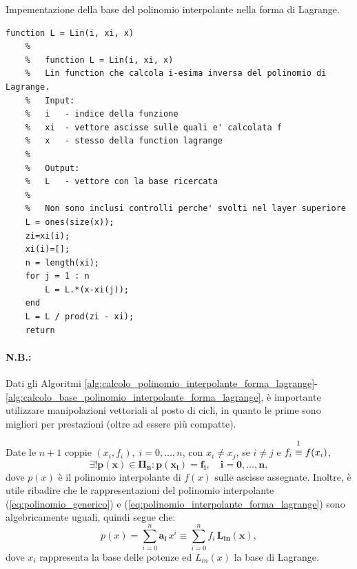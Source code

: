\begin{algorithm}
\caption{Impementazione della base del polinomio interpolante nella forma di Lagrange.}\label{alg:calcolo_base_polinomio_interpolante_forma_lagrange}
    \begin{lstlisting}[style=Matlab-editor]
    function L = Lin(i, xi, x)
    %
    %   function L = Lin(i, xi, x)
    %   Lin function che calcola i-esima inversa del polinomio di Lagrange.
    %   Input:
    %   i   - indice della funzione
    %   xi  - vettore ascisse sulle quali e' calcolata f
    %   x   - stesso della function lagrange
    %
    %   Output:
    %   L   - vettore con la base ricercata
    %
    %   Non sono inclusi controlli perche' svolti nel layer superiore
    L = ones(size(x));
    zi=xi(i);
    xi(i)=[];
    n = length(xi);
    for j = 1 : n
        L = L.*(x-xi(j));
    end
    L = L / prod(zi - xi);
    return
    \end{lstlisting}
\end{algorithm}

\paragraph{N.B.:} Dati gli Algoritmi \ref{alg:calcolo_polinomio_interpolante_forma_lagrange}-\ref{alg:calcolo_base_polinomio_interpolante_forma_lagrange}, è importante utilizzare manipolazioni vettoriali al posto di cicli, in quanto le prime sono migliori per prestazioni (oltre ad essere più compatte).

\begin{remark}
	Date le $n+1$ coppie $(x_i,f_i),\; i=0,\hdots,n$, con $x_i\neq x_j$, se $i\neq j$ e $f_i\overset{\footnotemark}{\equiv} f(x_i)$,
	\begin{equation*}
	    \boldsymbol{\exists!p(x)\in\Pi_n:p(x_i)=f_i,\quad i=0,\hdots, n},
	\end{equation*}
	dove $p(x)$ è il polinomio interpolante di $f(x)$ sulle ascisse assegnate. Inoltre, è utile ribadire che le rappresentazioni del polinomio interpolante (\ref{eq:polinomio_generico}) e (\ref{eq:polinomio_interpolante_forma_lagrange}) sono algebricamente uguali, quindi segue che: 
	\begin{equation}\label{eq:equivalenza_basi}
		p(x)=\sum_{i=0}^n \boldsymbol{a_i}\, x^i \equiv \sum_{i=0}^n f_i\, \boldsymbol{L_{in}(x)},
	\end{equation}
	dove $x_i$ rappresenta la base delle potenze ed $L_{in}(x)$ la base di Lagrange.
\end{remark}

